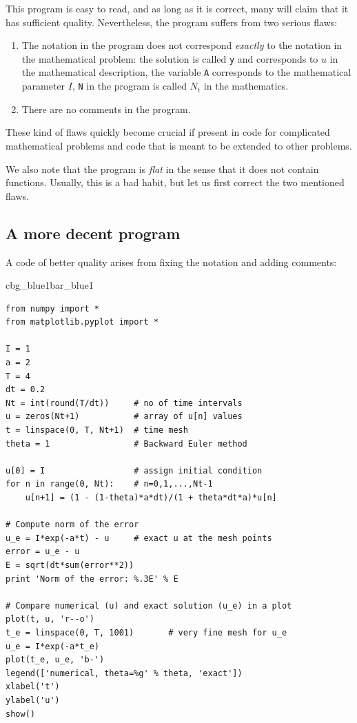 \documentclass[%
oneside,                 %
final,                   %
10pt]{article}
\newenvironment{_pro_tight}[2]{
   \def\FrameCommand{\color{#2}\vrule width 1mm\normalcolor\colorbox{#1}}
   \FrameRule0.6pt\MakeFramed {\advance\hsize-2mm\FrameRestore}\vskip3mm}
   {\vskip0mm\endMakeFramed}
\newenvironment{pro}[2]{
\bgroup\rmfamily
\fboxsep=0mm\relax
\begin{_pro_tight}{#1}{#2}
\list{}{\parsep=-2mm\parskip=0mm\topsep=0pt\leftmargin=2mm
\rightmargin=2\leftmargin\leftmargin=4pt\relax}
\item\relax}
{\endlist\end{_pro_tight}\egroup}
\begin{document}
This program is easy to read, and as long as it is correct, many will
claim that it has sufficient quality. Nevertheless, the program suffers
from two serious flaws:

\begin{enumerate}
\item The notation in the program does not correspond \emph{exactly} to
   the notation in the mathematical problem: the solution is called
   \texttt{y} and corresponds to $u$ in the mathematical description,
   the variable \texttt{A} corresponds to the mathematical parameter $I$,
   \texttt{N} in the program is called $N_t$ in the mathematics.

\item There are no comments in the program.
\end{enumerate}

\noindent
These kind of flaws quickly become crucial if present in code for complicated
mathematical problems and code that is meant to be extended to other problems.

We also note that the program is \emph{flat} in the sense that it does
not contain functions. Usually, this is a bad habit, but let us
first correct the two mentioned flaws.

\subsection{A more decent program}
\label{softeng1:basic:impl2}

A code of better quality arises from
fixing the notation and adding comments:

\begin{pro}{cbg_blue1}{bar_blue1}\begin{Verbatim}[numbers=none,fontsize=\fontsize{9pt}{9pt},baselinestretch=0.95,xleftmargin=2mm]
from numpy import *
from matplotlib.pyplot import *

I = 1
a = 2
T = 4
dt = 0.2
Nt = int(round(T/dt))     # no of time intervals
u = zeros(Nt+1)           # array of u[n] values
t = linspace(0, T, Nt+1)  # time mesh
theta = 1                 # Backward Euler method

u[0] = I                  # assign initial condition
for n in range(0, Nt):    # n=0,1,...,Nt-1
    u[n+1] = (1 - (1-theta)*a*dt)/(1 + theta*dt*a)*u[n]

# Compute norm of the error
u_e = I*exp(-a*t) - u     # exact u at the mesh points
error = u_e - u
E = sqrt(dt*sum(error**2))
print 'Norm of the error: %.3E' % E

# Compare numerical (u) and exact solution (u_e) in a plot
plot(t, u, 'r--o')
t_e = linspace(0, T, 1001)       # very fine mesh for u_e
u_e = I*exp(-a*t_e)
plot(t_e, u_e, 'b-')
legend(['numerical, theta=%g' % theta, 'exact'])
xlabel('t')
ylabel('u')
show()
\end{Verbatim}
\end{pro}
\noindent
\end{document}
